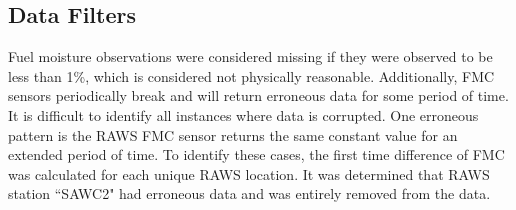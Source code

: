 \subsection*{Data Filters}

Fuel moisture observations were considered missing if they were observed to be less than 1\%, which is considered not physically reasonable. Additionally, FMC sensors periodically break and will return erroneous data for some period of time. It is difficult to identify all instances where data is corrupted. One erroneous pattern is the RAWS FMC sensor returns the same constant value for an extended period of time. To identify these cases, the first time difference of FMC was calculated for each unique RAWS location. It was determined that RAWS station ``SAWC2" had erroneous data and was entirely removed from the data.


